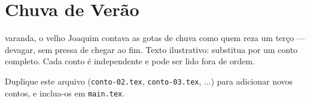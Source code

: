 \chapter{Chuva de Verão}

 varanda, o velho Joaquim contava as gotas de chuva
como quem reza um terço --- devagar, sem pressa de chegar ao fim. Texto
ilustrativo: substitua por um conto completo. Cada conto é independente
e pode ser lido fora de ordem.

Duplique este arquivo (\texttt{conto-02.tex}, \texttt{conto-03.tex}, ...)
para adicionar novos contos, e inclua-os em \texttt{main.tex}.
